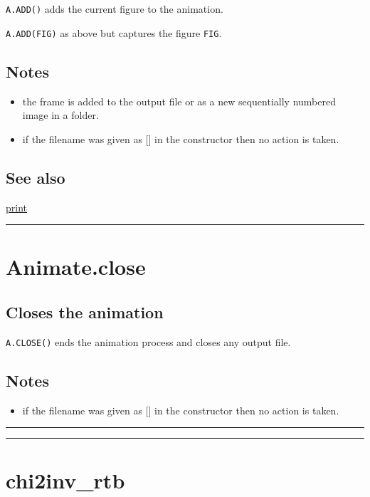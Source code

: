 \texttt{A.ADD()} adds the current figure to the animation.



\texttt{A.ADD(FIG)} as above but captures the figure \texttt{FIG}.


\subsection*{Notes}
\begin{itemize}
  \item the frame is added to the output file or as a new sequentially    numbered image in a folder.
  \item if the filename was given as [] in the constructor then no    action is taken.
\end{itemize}

\subsection*{See also}


\hyperlink{print}{\color{blue} print}

\vspace{1.5ex}\hrule

\hypertarget{Animate.close}{\section*{Animate.close}}
\subsection*{Closes the animation}


\texttt{A.CLOSE()} ends the animation process and closes any output file.


\subsection*{Notes}
\begin{itemize}
  \item if the filename was given as [] in the constructor then no    action is taken.
\end{itemize}
\vspace{1.5ex}\rule{\textwidth}{1mm}
\vspace{1.5ex}\rule{\textwidth}{1mm}

\hypertarget{chi2inv\_rtb}{\section*{chi2inv\_rtb}}
